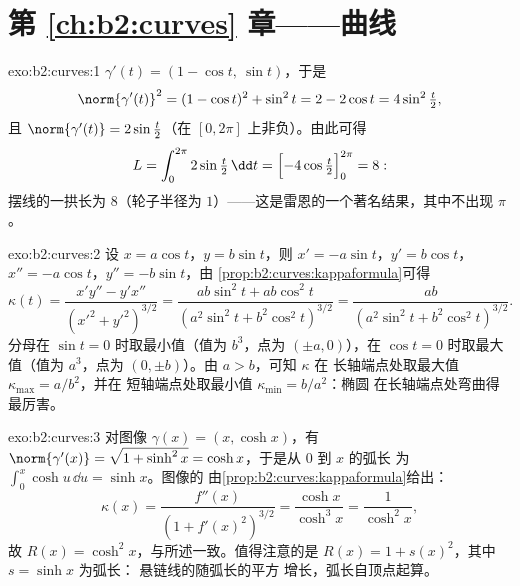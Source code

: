 \section*{第 \ref{ch:b2:curves} 章——曲线}

\begin{solution}{exo:b2:curves:1}
$\gamma'(t) = (1 - \cos t,\ \sin t)$，于是
\[
\norm{\gamma'(t)}^2 = (1 - \cos t)^2 + \sin^2 t
= 2 - 2\cos t = 4\sin^2\tfrac t2 ,
\]
且 $\norm{\gamma'(t)} = 2\sin\frac t2$（在 $[0,
2\pi]$ 上非负）。由此可得
\[
L = \int_0^{2\pi} 2\sin\tfrac t2\,\dd t
= \Bigl[-4\cos\tfrac t2\Bigr]_0^{2\pi} = 8 :
\]
摆线的一拱长为 $8$（轮子半径为
$1$）——这是雷恩的一个著名结果，其中不出现 $\pi$。
\end{solution}

\begin{solution}{exo:b2:curves:2}
设 $x = a\cos t$，$y = b\sin t$，则 $x' = -a\sin t$，$y' = b\cos
t$，$x'' = -a\cos t$，$y'' = -b\sin t$，由
\cref{prop:b2:curves:kappaformula}可得
\[
\kappa(t)
= \frac{x'y'' - y'x''}{(x'^2 + y'^2)^{3/2}}
= \frac{ab\sin^2 t + ab\cos^2 t}
       {(a^2\sin^2 t + b^2\cos^2 t)^{3/2}}
= \frac{ab}{(a^2\sin^2 t + b^2\cos^2 t)^{3/2}} .
\]
分母在 $\sin t = 0$ 时取最小值（值为 $b^3$，点为
$(\pm a, 0)$），在 $\cos t = 0$ 时取最大值（值为 $a^3$，点为
$(0, \pm b)$）。由 $a > b$，可知 $\kappa$ 在
长轴端点处取最大值 $\kappa_{\max} = a/b^2$，并在
短轴端点处取最小值 $\kappa_{\min} = b/a^2$：椭圆
在长轴端点处弯曲得最厉害。
\end{solution}

\begin{solution}{exo:b2:curves:3}
对图像 $\gamma(x) = (x, \cosh x)$，有 $\norm{\gamma'(x)} =
\sqrt{1 + \sinh^2 x} = \cosh x$，于是从 $0$ 到 $x$ 的弧长
为 $\int_0^x \cosh u\,\dd u = \sinh x$。图像的
由\cref{prop:b2:curves:kappaformula}给出：
\[
\kappa(x) = \frac{f''(x)}{(1 + f'(x)^2)^{3/2}}
= \frac{\cosh x}{\cosh^3 x} = \frac{1}{\cosh^2 x} ,
\]
故 $R(x) = \cosh^2 x$，与所述一致。值得注意的是
$R(x) = 1 + s(x)^2$，其中 $s = \sinh x$ 为弧长：
悬链线的随弧长的平方
增长，弧长自顶点起算。
\end{solution}

